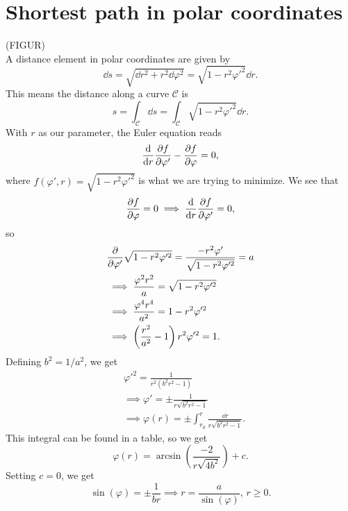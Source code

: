 \documentclass{article}
\newcommand{\Ce}{\mathcal{C}}
\begin{document}
    \section{Shortest path in polar coordinates}
        (FIGUR) \\
        A distance element in polar coordinates are given by
        \begin{equation*}
            \dd s = \sqrt{\dd r^2 + r^2 \dd \varphi ^2} = \sqrt{1 - r^2 \varphi'^2} \dd r.
        \end{equation*}
        This means the distance along a curve $\Ce$ is
        \begin{equation*}
            s = \int_\Ce \dd s = \int_\Ce \sqrt{1 - r^2 \varphi'^2} \dd r.
        \end{equation*}
        With $r$ as our parameter, the Euler equation reads
        \begin{equation*}
            \dv{r} \pdv{f}{\varphi'} - \pdv{f}{\varphi} = 0,
        \end{equation*}
        where $f(\varphi', r) = \sqrt{1 - r^2 \varphi'^2}$ is what we are trying to minimize. We see that
        \begin{equation*}
            \pdv{f}{\varphi} = 0 \implies \dv{r} \pdv{f}{\varphi'} = 0,
        \end{equation*}
        so 
        \begin{align*}
            &\pdv{\varphi'} \sqrt{1 - r^2 \varphi'^2} = \frac{- r^2 \varphi'}{\sqrt{1 - r^2 \varphi'^2} } = a \\
            &\implies \frac{\varphi^2 r^2}{a} = \sqrt{1 - r^2 \varphi'^2} \\
            &\implies \frac{\varphi^4 r^4}{a^2} = 1 - r^2 \varphi'^2 \\
            &\implies \left( \frac{r^2}{a^2} - 1 \right)r^2 \varphi'^2 = 1.
        \end{align*}
        Defining $b^2 = 1 / a^2$, we get 
        \begin{align*}
            &\varphi'^2 = \frac{1}{r^2(b^2 r^2 - 1)} \\
            & \implies \varphi' = \pm \frac{1}{r \sqrt{b^2 r^2 - 1}} \\
            & \implies \varphi(r) = \pm \int_{r_0}^r \frac{\dd r}{r \sqrt{b^2 r^2 - 1}}.
        \end{align*}
        This integral can be found in a table, so we get
        \begin{equation*}
            \varphi(r) = \arcsin\left( \frac{-2}{r \sqrt{4b^2}}\right) + c.
        \end{equation*}
        Setting $c=0$, we get
        \begin{equation*}
            \sin(\varphi) = \pm \frac{1}{br} \implies r = \frac{a}{\sin(\varphi)}, \,r\geq 0.
        \end{equation*}
\end{document}
